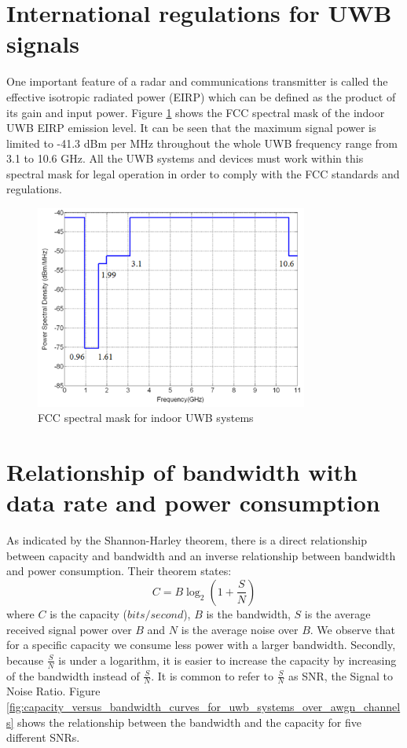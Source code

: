 \documentclass[\main/main.tex]{subfiles}
\begin{document}
\section{International regulations for UWB signals}

One important feature of a radar and communications transmitter is called the effective isotropic radiated power (EIRP) which can be defined as the product of its gain and input power. Figure \ref{fig:fcc_spectral_mask_for_indoor_uwb_systems} shows the FCC spectral mask of the indoor UWB EIRP emission level. It can be seen that the maximum signal power is limited to -41.3 dBm per MHz throughout the whole UWB frequency range from 3.1 to 10.6 GHz. All the UWB systems and devices must work within this spectral mask for legal operation in order to comply with the FCC standards and regulations.

\begin{figure}[H]
    \centering
    \includegraphics[width=0.8\textwidth]{fcc_spectral_mask_for_indoor_uwb_systems}
    \caption{FCC spectral mask for indoor UWB systems}
    \label{fig:fcc_spectral_mask_for_indoor_uwb_systems}
\end{figure}

\section{Relationship of bandwidth with data rate and power consumption}
As indicated by the Shannon-Harley theorem, there is a direct relationship between capacity and bandwidth and an inverse relationship between bandwidth and power consumption. Their theorem states: 
\begin{equation}
    C=B\log_2(1+\frac{S}{N})
\end{equation} where $C$ is the capacity ($bits/second$), $B$ is the bandwidth, $S$ is the average received signal power over $B$ and $N$ is the average noise over $B$. We observe that for a specific capacity we consume less power with a larger bandwidth. Secondly, because $\frac{S}{N}$ is under a logarithm, it is easier to increase the capacity by increasing of the bandwidth instead of $\frac{S}{N}$. It is common to refer to $\frac{S}{N}$ as SNR, the Signal to Noise Ratio. Figure \ref{fig:capacity_versus_bandwidth_curves_for_uwb_systems_over_awgn_channels} shows the relationship between the bandwidth and the capacity for five different SNRs.
\end{document}
